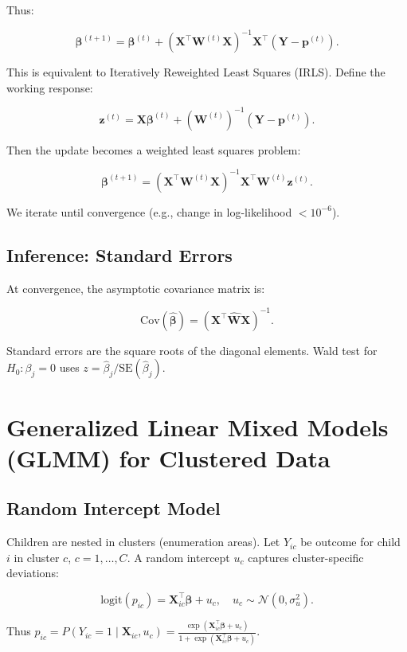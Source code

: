 \documentclass[12pt]{article}
\begin{document}
	Thus:
	
	\[
	\boldsymbol{\beta}^{(t+1)} = \boldsymbol{\beta}^{(t)} + (\mathbf{X}^\top \mathbf{W}^{(t)} \mathbf{X})^{-1} \mathbf{X}^\top (\mathbf{Y} - \mathbf{p}^{(t)}).
	\]
	
	This is equivalent to Iteratively Reweighted Least Squares (IRLS). Define the working response:
	
	\[
	\mathbf{z}^{(t)} = \mathbf{X}\boldsymbol{\beta}^{(t)} + (\mathbf{W}^{(t)})^{-1} (\mathbf{Y} - \mathbf{p}^{(t)}).
	\]
	
	Then the update becomes a weighted least squares problem:
	
	\[
	\boldsymbol{\beta}^{(t+1)} = (\mathbf{X}^\top \mathbf{W}^{(t)} \mathbf{X})^{-1} \mathbf{X}^\top \mathbf{W}^{(t)} \mathbf{z}^{(t)}.
	\]
	
	We iterate until convergence (e.g., change in log-likelihood $< 10^{-6}$).
	
	\subsection{Inference: Standard Errors}
	
	At convergence, the asymptotic covariance matrix is:
	
	\[
	\text{Cov}(\hat{\boldsymbol{\beta}}) = (\mathbf{X}^\top \hat{\mathbf{W}} \mathbf{X})^{-1}.
	\]
	
	Standard errors are the square roots of the diagonal elements. Wald test for $H_0: \beta_j = 0$ uses $z = \hat{\beta}_j / \text{SE}(\hat{\beta}_j)$.
	
	\section{Generalized Linear Mixed Models (GLMM) for Clustered Data}
	
	\subsection{Random Intercept Model}
	
	Children are nested in clusters (enumeration areas). Let $Y_{ic}$ be outcome for child $i$ in cluster $c$, $c=1,\dots,C$. A random intercept $u_c$ captures cluster-specific deviations:
	
	\[
	\text{logit}(p_{ic}) = \mathbf{X}_{ic}^\top \boldsymbol{\beta} + u_c, \quad u_c \sim \mathcal{N}(0, \sigma_u^2).
	\]
	
	Thus $p_{ic} = P(Y_{ic}=1 \mid \mathbf{X}_{ic}, u_c) = \frac{\exp(\mathbf{X}_{ic}^\top \boldsymbol{\beta} + u_c)}{1 + \exp(\mathbf{X}_{ic}^\top \boldsymbol{\beta} + u_c)}$.
	
\end{document}
